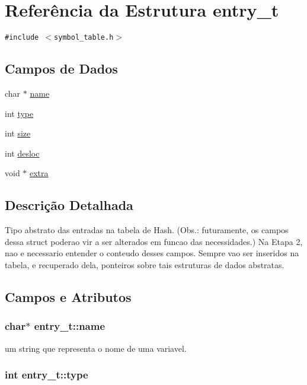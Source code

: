 \hypertarget{structentry__t}{
\section{Referência da Estrutura entry\_\-t}
\label{structentry__t}
}
{\tt \#include $<$symbol\_\-table.h$>$}

\subsection*{Campos de Dados}
\begin{CompactItemize}
\item 
char $\ast$ \hyperlink{structentry__t_b04f7c44381c01e411be318875eb5eb6}{name}
\item 
int \hyperlink{structentry__t_f284680fed934779f16fc2b6a42101b1}{type}
\item 
int \hyperlink{structentry__t_67460ae77b6a4433d48f7736ee6a500a}{size}
\item 
int \hyperlink{structentry__t_bc62dec01315bbb72bff20ce69d8ef37}{desloc}
\item 
void $\ast$ \hyperlink{structentry__t_6f7a7b18bd57fafba8d1f2d257ac3863}{extra}
\end{CompactItemize}


\subsection{Descrição Detalhada}
Tipo abstrato das entradas na tabela de Hash. (Obs.: futuramente, os campos dessa struct poderao vir a ser alterados em funcao das necessidades.) Na Etapa 2, nao e necessario entender o conteudo desses campos. Sempre vao ser inseridos na tabela, e recuperado dela, ponteiros sobre tais estruturas de dados abstratas. 

\subsection{Campos e Atributos}
\hypertarget{structentry__t_b04f7c44381c01e411be318875eb5eb6}{
\subsubsection{\setlength{\rightskip}{0pt plus 5cm}char$\ast$ {\bf entry\_\-t::name}}}
\label{structentry__t_b04f7c44381c01e411be318875eb5eb6}


um string que representa o nome de uma variavel. \hypertarget{structentry__t_f284680fed934779f16fc2b6a42101b1}{
\subsubsection{\setlength{\rightskip}{0pt plus 5cm}int {\bf entry\_\-t::type}}}
\label{structentry__t_f284680fed934779f16fc2b6a42101b1}


